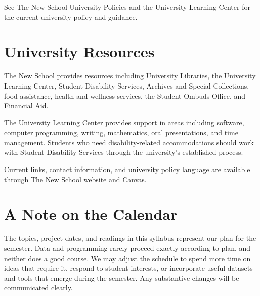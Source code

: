 \documentclass[11pt]{article}
\begin{document}
See The New School University Policies and the University Learning Center for
the current university policy and guidance.

\section{University Resources}

The New School provides resources including University Libraries, the
University Learning Center, Student Disability Services, Archives and Special
Collections, food assistance, health and wellness services, the Student
Ombuds Office, and Financial Aid.

The University Learning Center provides support in areas including software,
computer programming, writing, mathematics, oral presentations, and time
management. Students who need disability-related accommodations should work
with Student Disability Services through the university's established
process.

Current links, contact information, and university policy language are
available through The New School website and Canvas.

\section{A Note on the Calendar}

The topics, project dates, and readings in this syllabus represent our plan
for the semester. Data and programming rarely proceed exactly according to
plan, and neither does a good course. We may adjust the schedule to spend more
time on ideas that require it, respond to student interests, or incorporate
useful datasets and tools that emerge during the semester. Any substantive
changes will be communicated clearly.
\end{document}
